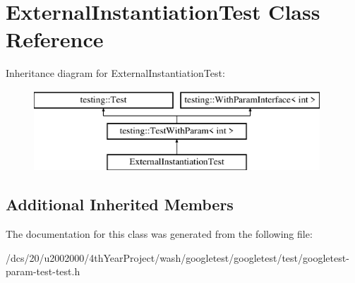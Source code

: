 \hypertarget{classExternalInstantiationTest}{}\section{External\+Instantiation\+Test Class Reference}
\label{classExternalInstantiationTest}
Inheritance diagram for External\+Instantiation\+Test\+:\begin{figure}[H]
\begin{center}
\leavevmode
\includegraphics[height=3.000000cm]{classExternalInstantiationTest}
\end{center}
\end{figure}
\subsection*{Additional Inherited Members}


The documentation for this class was generated from the following file\+:\begin{DoxyCompactItemize}
\item 
/dcs/20/u2002000/4th\+Year\+Project/wash/googletest/googletest/test/googletest-\/param-\/test-\/test.\+h\end{DoxyCompactItemize}
